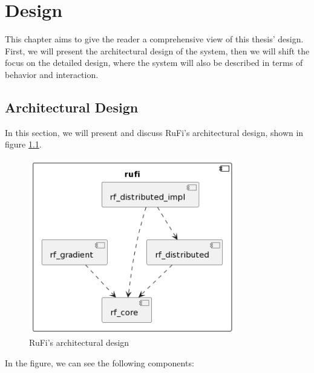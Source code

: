 
\chapter{Design}
\label{chap:design}
This chapter aims to give the reader a comprehensive view of this thesis' design. First, we will present the architectural design of the system, then we will shift the focus on
the detailed design, where the system will also be described in terms of behavior and interaction.

\section{Architectural Design}
\label{sec:architectural-design}
In this section, we will present and discuss RuFi's architectural design, shown in figure \ref{fig:rufi-architecture}.

\begin{figure}[ht]
    \centering
    \includegraphics[width=0.8\textwidth]{figures/diagrams/img/rufi-architecture.png}
    \caption{RuFi's architectural design}
    \label{fig:rufi-architecture}
\end{figure}

In the figure, we can see the following components:

